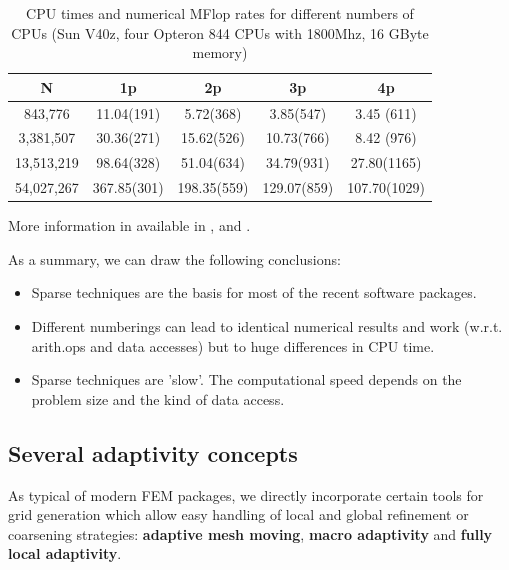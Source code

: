 \begin{table}[!h]
\begin{center}
\begin{tabular}{|c|c|c|c|c|} \hline
N         &    1p        &    2p       &     3p      &      4p\\ \hline
843,776    &  11.04(191)  &  5.72(368)  &  3.85(547)  &  3.45 (611) \\ 
3,381,507   &  30.36(271)  &  15.62(526) &  10.73(766) &  8.42 (976) \\
13,513,219  &  98.64(328)  &  51.04(634) &  34.79(931) &  27.80(1165) \\
54,027,267  &  367.85(301) & 198.35(559) &  129.07(859) & 107.70(1029) \\ \hline
\end{tabular}
\end{center}
\caption{CPU times and numerical MFlop rates for different numbers of CPUs
(Sun V40z, four Opteron 844 CPUs with 1800Mhz, 16 GByte memory)}
\label{sbblasresults}
\end{table}


More information in available in \cite{AltieriBeckerTurek1998}, \cite{BeckerKilianTurek1999a} and
\cite{TurekBeckerKilian2003a}.

As a summary, we can draw the following conclusions:
\begin{itemize}
\item Sparse techniques are the basis for most of the recent
software packages.
\item Different numberings can lead to identical
numerical results and work (w.r.t. arith.ops and data accesses) but
to huge differences in CPU time.
\item Sparse techniques are 'slow'. The computational speed depends on the problem 
size and the kind of data access.
\end{itemize}


\subsection{Several adaptivity concepts}

As typical of modern FEM packages, we directly incorporate certain tools for grid 
generation which allow easy handling of local and global refinement or coarsening strategies:
{\bf adaptive mesh moving}, {\bf macro adaptivity} and {\bf fully local adaptivity}.


